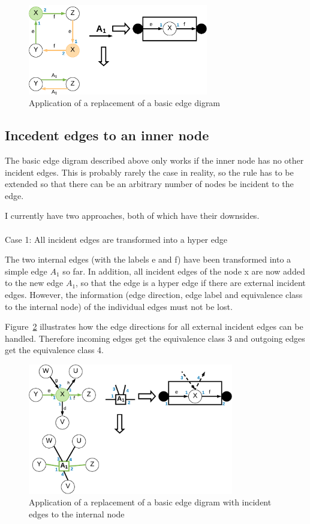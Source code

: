 \documentclass[a4paper]{scrartcl}
\begin{document}
\begin{figure}[h]
	\centering
	\includegraphics[width=0.7\textwidth]{img/basicEdgeDigram}
	\caption{Application of a replacement of a basic edge digram}
	\label{fig:basicEdgeDigram}
\end{figure}


\subsection*{Incedent edges to an inner node}
\label{sec:incedentEdges}

The basic edge digram described above only works if the inner node has no other incident edges. This is probably rarely the case in reality, so the rule has to be extended so that there can be an arbitrary number of nodes be incident to the edge.

I currently have two approaches, both of which have their downsides.
\\\\
Case 1: All incident edges are transformed into a hyper edge

The two internal edges (with the labels e and f) have been transformed into a simple edge $A_1$ so far. In addition, all incident edges of the node x are now added to the new edge $A_1$, so that the edge is a hyper edge if there are external incident edges. However, the information (edge direction, edge label and equivalence class to the internal node) of the individual edges must not be lost. 

Figure~\ref{fig:incedentEdges1} illustrates how the edge directions for all external incident edges can be handled. Therefore incoming edges get the equivalence class 3 and outgoing edges get the equivalence class 4. 

\begin{figure}[h]
	\centering
	\includegraphics[width=0.8\textwidth]{img/edgeDigram_params}
	\caption{Application of a replacement of a basic edge digram with incident edges to the internal node}
	\label{fig:incedentEdges1}
\end{figure}
\end{document}
